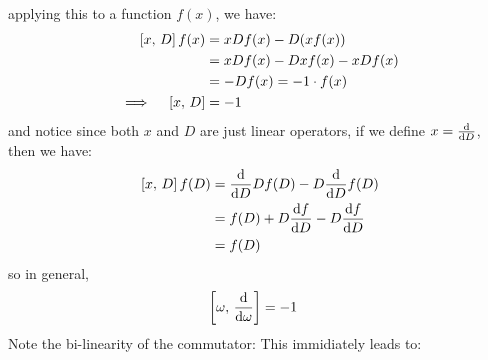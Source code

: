 applying this to a function $f(x)$, we have:
\begin{align}
  \left\lbrack x ,\, D \right\rbrack f(x)           & = x D f(x) - D (x f(x))          \\
                              & = x D f(x) - D x f(x) - x D f(x) \\
                              & = - D f(x) = - 1 \cdot f(x)      \\
  \implies \quad \left\lbrack x ,\, D \right\rbrack & = -1
\end{align}
and notice since both $x$ and $D$ are just linear operators, if we define $x = \odv{}{D}$, then we have:
\begin{align}
  \commt{x}{D} f(D) & = \odv{}{D} D f(D) - D \odv{}{D} f(D) \\
                    & = f(D) + D \odv{f}{D} - D \odv{f}{D}  \\
                    & =  f(D)
\end{align}
so in general,
\begin{align}
  \commt{\omega}{\odv{}{\omega}} & = -1
\end{align}
Note the bi-linearity of the commutator:
This immidiately leads to:


